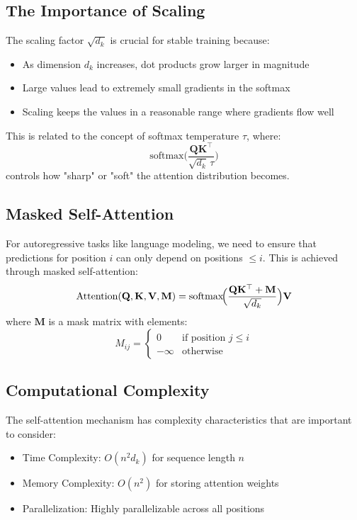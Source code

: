 \subsection{The Importance of Scaling}
\noindent
The scaling factor $\sqrt{d_k}$ is crucial for stable training because:
\begin{itemize}
    \item As dimension $d_k$ increases, dot products grow larger in magnitude
    \item Large values lead to extremely small gradients in the softmax
    \item Scaling keeps the values in a reasonable range where gradients flow well
\end{itemize}

This is related to the concept of softmax temperature $\tau$, where:
\[
\text{softmax}\bigl(\frac{\mathbf{Q}\mathbf{K}^\top}{\sqrt{d_k} \,\tau}\bigr)
\]
controls how "sharp" or "soft" the attention distribution becomes.

\subsection{Masked Self-Attention}
\noindent
For autoregressive tasks like language modeling, we need to ensure that predictions for position $i$ can only depend on positions $\leq i$. This is achieved through masked self-attention:
\[
\text{Attention}(\mathbf{Q}, \mathbf{K}, \mathbf{V}, \mathbf{M}) 
= \text{softmax}\!\Bigl(\frac{\mathbf{Q} \mathbf{K}^\top + \mathbf{M}}{\sqrt{d_k}}\Bigr) \mathbf{V}
\]
where $\mathbf{M}$ is a mask matrix with elements:
\[
M_{ij} = \begin{cases}
    0 & \text{if position } j \leq i \\
    -\infty & \text{otherwise}
\end{cases}
\]

\subsection{Computational Complexity}
\noindent
The self-attention mechanism has complexity characteristics that are important to consider:
\begin{itemize}
    \item Time Complexity: $O(n^2d_k)$ for sequence length $n$
    \item Memory Complexity: $O(n^2)$ for storing attention weights
    \item Parallelization: Highly parallelizable across all positions
\end{itemize}

